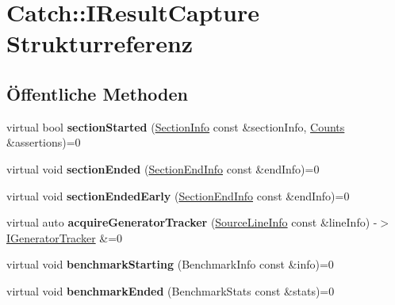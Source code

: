 \hypertarget{structCatch_1_1IResultCapture}{}\section{Catch\+:\+:I\+Result\+Capture Strukturreferenz}
\label{structCatch_1_1IResultCapture}
\subsection*{Öffentliche Methoden}
\begin{DoxyCompactItemize}
\item 
\mbox{\label{structCatch_1_1IResultCapture_a5b76ed52badcb64cf374202e12b81a03}} 
virtual bool {\bfseries section\+Started} (\hyperlink{structCatch_1_1SectionInfo}{Section\+Info} const \&section\+Info, \hyperlink{structCatch_1_1Counts}{Counts} \&assertions)=0
\item 
\mbox{\label{structCatch_1_1IResultCapture_a4e152bc43dc0933684e31fa67a58195d}} 
virtual void {\bfseries section\+Ended} (\hyperlink{structCatch_1_1SectionEndInfo}{Section\+End\+Info} const \&end\+Info)=0
\item 
\mbox{\label{structCatch_1_1IResultCapture_afcc71eef8ca821ae132cced4a2be6988}} 
virtual void {\bfseries section\+Ended\+Early} (\hyperlink{structCatch_1_1SectionEndInfo}{Section\+End\+Info} const \&end\+Info)=0
\item 
\mbox{\label{structCatch_1_1IResultCapture_ab020d111e29ad1cabe1227dcfda712ef}} 
virtual auto {\bfseries acquire\+Generator\+Tracker} (\hyperlink{structCatch_1_1SourceLineInfo}{Source\+Line\+Info} const \&line\+Info) -\/$>$ \hyperlink{structCatch_1_1IGeneratorTracker}{I\+Generator\+Tracker} \&=0
\item 
\mbox{\label{structCatch_1_1IResultCapture_a264ae12330c74b2daae41715a30d51bf}} 
virtual void {\bfseries benchmark\+Starting} (Benchmark\+Info const \&info)=0
\item 
\mbox{\label{structCatch_1_1IResultCapture_a6e5e64f9d94211a888249012ab6cc7fb}} 
virtual void {\bfseries benchmark\+Ended} (Benchmark\+Stats const \&stats)=0

\end{DoxyCompactItemize}
